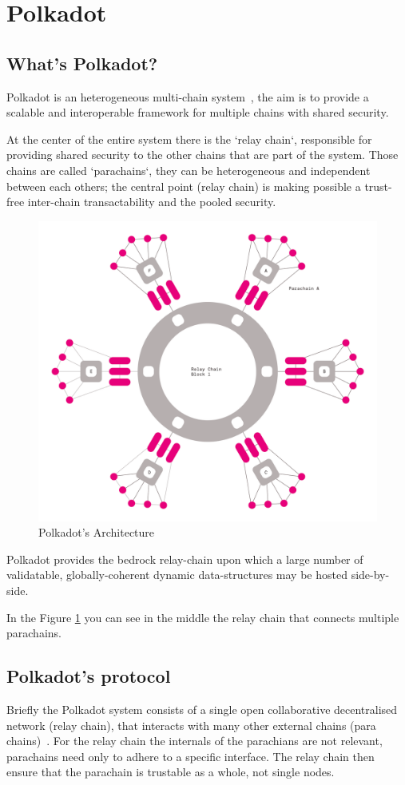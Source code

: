 \documentclass[../main.tex]{subfiles}
\begin{document}
\section{Polkadot}
\subsection{What's Polkadot?}

Polkadot is an heterogeneous multi-chain system~\cite{wood2016polkadot}, the aim is to provide a scalable and interoperable framework for multiple chains with shared security.~\cite{burdges2020overview}

At the center of the entire system there is the `relay chain`, responsible for providing shared security to the other chains that are part of the system. Those chains are called `parachains`, they can be heterogeneous and independent between each others; the central point (relay chain) is making possible a trust-free inter-chain transactability and the pooled security.~\cite{burdges2020overview}

\begin{figure}[h]
  \centering
  \includegraphics[width=0.4\linewidth]{polkadot_architecture.png}
  \caption{Polkadot's Architecture}
  \label{fig:polkadot_arch}
\end{figure}

Polkadot provides the bedrock relay-chain upon which a large number of validatable, globally-coherent dynamic data-structures may be hosted side-by-side.~\cite{wood2016polkadot}

In the Figure \ref{fig:polkadot_arch} you can see in the middle the relay chain that connects multiple parachains.

\subsection{Polkadot's protocol}

Briefly the Polkadot system consists of a single open collaborative decentralised network (relay chain), that interacts with many other external chains (para chains)~\cite{burdges2020overview}. For the relay chain the internals of the parachians are not relevant, parachains need only to adhere to a specific interface. The relay chain then ensure that the parachain is trustable as a whole, not single nodes.
\end{document}
